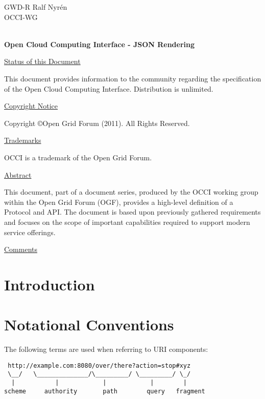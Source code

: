 \documentclass[10pt,a4paper]{article}
\begin{document}
\thispagestyle{empty}

GWD-R \hfill Ralf Nyrén \\
OCCI-WG \\
\\

\vspace*{0.5in}

\begin{Large}
\textbf{Open Cloud Computing Interface - JSON Rendering}
\end{Large}

\vspace*{0.5in}

\underline{Status of this Document}

This document provides information to the community regarding the
specification of the Open Cloud Computing Interface. Distribution is
unlimited.

\underline{Copyright Notice}

Copyright \copyright Open Grid Forum (2011). All Rights Reserved.

\underline{Trademarks}

OCCI is a trademark of the Open Grid Forum.

\underline{Abstract}

This document, part of a document series, produced by the OCCI working
group within the Open Grid Forum (OGF), provides a high-level
definition of a Protocol and API. The document is based upon
previously gathered requirements and focuses on the scope of important
capabilities required to support modern service offerings.

\underline{Comments}
\newcommand{\ralf}[1]{\textcolor{red}{RN: #1}}

\newpage
\tableofcontents
\newpage

\section{Introduction}
%

\section{Notational Conventions}


The following terms \cite{rfc3986} are used when referring to URI
components:

\begin{verbatim}
 http://example.com:8080/over/there?action=stop#xyz
 \__/   \______________/\_________/ \_________/ \_/
  |           |            |            |        |
scheme     authority       path        query   fragment
\end{verbatim}
\end{document}
